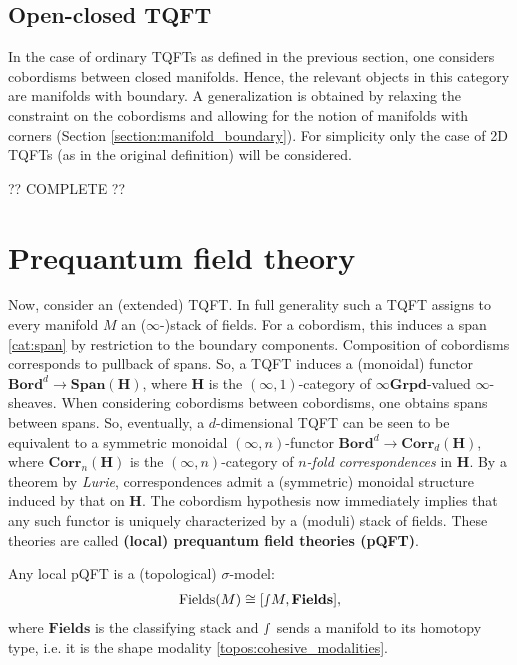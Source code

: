 \subsection{Open-closed TQFT}

    In the case of ordinary TQFTs as defined in the previous section, one considers cobordisms between closed manifolds. Hence, the relevant objects in this category are manifolds with boundary. A generalization is obtained by relaxing the constraint on the cobordisms and allowing for the notion of manifolds with corners (Section \ref{section:manifold_boundary}). For simplicity only the case of 2D TQFTs (as in the original definition) will be considered.

    ?? COMPLETE ??

\section{Prequantum field theory}

    Now, consider an (extended) TQFT. In full generality such a TQFT assigns to every manifold $M$ an ($\infty$-)stack of fields. For a cobordism, this induces a span \ref{cat:span} by restriction to the boundary components. Composition of cobordisms corresponds to pullback of spans. So, a TQFT induces a (monoidal) functor $\mathbf{Bord}^d\rightarrow\mathbf{Span}(\mathbf{H})$, where $\mathbf{H}$ is the $(\infty,1)$-category of $\infty\mathbf{Grpd}$-valued $\infty$-sheaves. When considering cobordisms between cobordisms, one obtains spans between spans. So, eventually, a $d$-dimensional TQFT can be seen to be equivalent to a symmetric monoidal $(\infty,n)$-functor $\mathbf{Bord}^d\rightarrow\mathbf{Corr}_d(\mathbf{H})$, where $\mathbf{Corr}_n(\mathbf{H})$ is the $(\infty,n)$-category of \textit{$n$-fold correspondences} in $\mathbf{H}$. By a theorem by \textit{Lurie}, correspondences admit a (symmetric) monoidal structure induced by that on $\mathbf{H}$. The cobordism hypothesis now immediately implies that any such functor is uniquely characterized by a (moduli) stack of fields. These theories are called \textbf{(local) prequantum field theories (pQFT)}.

    \begin{property}
        Any local pQFT is a (topological) $\sigma$-model:
        \begin{gather}
            \mathrm{Fields}(M)\cong[\smallint\!M,\mathbf{Fields}],
        \end{gather}
        where $\mathbf{Fields}$ is the classifying stack and $\smallint$ sends a manifold to its homotopy type, i.e. it is the shape modality \ref{topos:cohesive_modalities}.
    \end{property}

